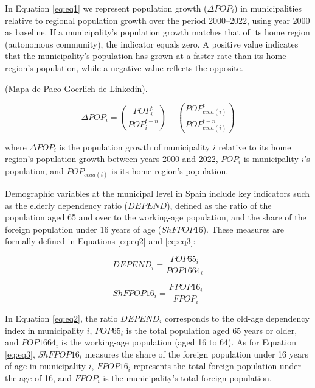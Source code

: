 \documentclass[a4paper,11pt,oneside]{article}
\begin{document}
In Equation \eqref{eq:eq1} we represent population growth ($\Delta POP_i$) in municipalities relative to regional population growth over the period 2000--2022, using year 2000 as baseline. If a municipality's population growth matches that of its home region (autonomous community), the indicator equals zero. A positive value indicates that the municipality's population has grown at a faster rate than its home region's population, while a negative value reflects the opposite.

{\color{red} (Mapa de Paco Goerlich de Linkedin).}



\begin{equation}
\label{eq:eq1}
\Delta POP_i = \left(\frac{POP_i^{t}}{POP_i^{t-n}}\right) - \left(\frac{POP_{ccaa(i)}^{t}}{POP_{ccaa(i)}^{t-n}} \right)
\end{equation}

\noindent where $\Delta POP_i$ is the population growth of municipality $i$ relative to its home region's population growth between years 2000 and 2022, $POP_i$ is municipality $i$'s population, and $POP_{ccaa(i)}$ is its home region's population.



Demographic variables at the municipal level in Spain include key indicators such as the elderly dependency ratio ($DEPEND$), defined as the ratio of the population aged 65 and over to the working-age population, and the share of the foreign population under 16 years of age ($ShFPOP16$). These measures are formally defined in Equations \eqref{eq:eq2} and \eqref{eq:eq3}:



\begin{equation}
\label{eq:eq2}
DEPEND_i =
\frac{POP65_i}{POP1664_i}
\end{equation}

\begin{equation}
\label{eq:eq3}
ShFPOP16_i=
\frac{FPOP16_i}{FPOP_i}
\end{equation}


In Equation \eqref{eq:eq2}, the ratio $DEPEND_i$ corresponds to the old-age dependency index in municipality $i$, $POP65_i$ is the total population aged 65 years or older, and $POP1664_i$ is the working-age population (aged 16 to 64). As for Equation \eqref{eq:eq3}, $ShFPOP16_i$ measures the share of the foreign population under 16 years of age in municipality $i$, $FPOP16_i$ represents the total foreign population under the age of 16, and $FPOP_i$ is the municipality's total foreign population.
\end{document}
